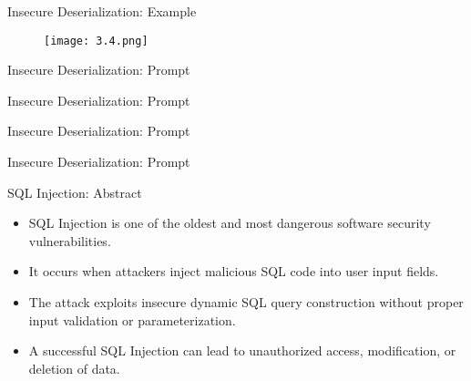 \documentclass[t,ignorenonframetext]{beamer}
\begin{document}
\begin{frame}{Insecure Deserialization: Example}
\begin{figure}[htb]
	\centering
	\texttt{[image: 3.4.png]}
\end{figure}
\end{frame}
\begin{frame}{Insecure Deserialization: Prompt}
\begin{tcolorbox}
[colback=blue!5!white,colframe=navy!75!black,title=Persona]

\end{tcolorbox}
\end{frame}
\begin{frame}{Insecure Deserialization: Prompt}
\begin{tcolorbox}
[colback=blue!5!white,colframe=navy!75!black,title=Context]

\end{tcolorbox}
\end{frame}

\begin{frame}{Insecure Deserialization: Prompt}
\begin{tcolorbox}
[colback=blue!5!white,colframe=navy!75!black,title=Tasks (Part 1)]

\end{tcolorbox}
\end{frame}

\begin{frame}{Insecure Deserialization: Prompt}
\begin{tcolorbox}
[colback=blue!5!white,colframe=navy!75!black,title=Tasks (Part 2)]

\end{tcolorbox}
\end{frame}

\begin{frame}{SQL Injection: Abstract}
\begin{itemize}
    \item SQL Injection is one of the oldest and most dangerous software security vulnerabilities.
    \item It occurs when attackers inject malicious SQL code into user input fields.
    \item The attack exploits insecure dynamic SQL query construction without proper input validation or parameterization.
    \item A successful SQL Injection can lead to unauthorized access, modification, or deletion of data.
\end{itemize}
\end{frame}
\end{document}
